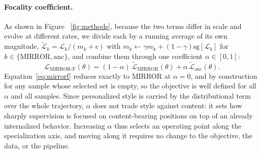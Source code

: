 \documentclass{article} %
\newcommand{\sg}[1]{\mathrm{sg}\!\left[#1\right]}
\begin{document}
\paragraph{Focality coefficient.}
As shown in Figure ~\ref{fig:methods}, because the two terms differ in scale and evolve at different rates, we divide each by a
running average of its own magnitude,
$\tilde{\mathcal{L}}_{k} = \mathcal{L}_{k}/(m_{k} + \epsilon)$ with
$m_{k} \leftarrow \gamma m_{k} + (1-\gamma)\sg{\mathcal{L}_{k}}$ for
$k \in \{\mathrm{MIRROR}, \mathrm{anc}\}$, and combine them through one coefficient
$\alpha \in [0,1]$:
\begin{equation}
    \mathcal{L}_{\mathrm{MIRROR\text{-}F}}(\theta)
    =
    (1-\alpha)\,\tilde{\mathcal{L}}_{\mathrm{MIRROR}}(\theta)
    + \alpha\,\tilde{\mathcal{L}}_{\mathrm{anc}}(\theta).
    \label{eq:mirrorf}
\end{equation}
Equation~\ref{eq:mirrorf} reduces exactly to MIRROR at $\alpha = 0$, and by construction for
any sample whose selected set is empty, so the objective is well defined for all $\alpha$
and all samples. Since personalized style is carried by the distributional term over the
whole trajectory, $\alpha$ does not trade style against content: it sets how sharply
supervision is focused on content-bearing positions on top of an already internalized
behavior. Increasing $\alpha$ thus selects an operating point along the specialization axis,
and moving along it requires no change to the objective, the data, or the pipeline. 
\end{document}
